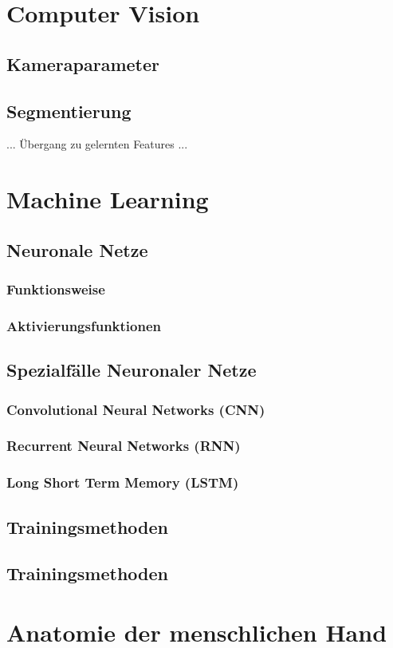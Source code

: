 \section { Computer Vision }
	\subsection { Kameraparameter }
	\subsection { Segmentierung }
		
	... Übergang zu gelernten Features ... 
	
\section { Machine Learning }
	
	\subsection { Neuronale Netze }
		\subsubsection { Funktionsweise }
		\subsubsection { Aktivierungsfunktionen }
		
	\subsection { Spezialfälle Neuronaler Netze}
		\subsubsection { Convolutional Neural Networks (CNN) }
		\subsubsection { Recurrent Neural Networks (RNN) }
		\subsubsection { Long Short Term Memory (LSTM) }
	
	\subsection { Trainingsmethoden }
	
	\subsection { Trainingsmethoden }
	
\section { Anatomie der menschlichen Hand }
